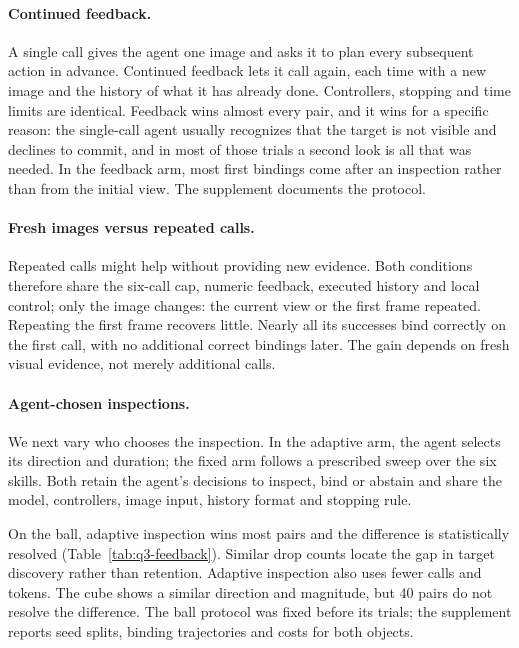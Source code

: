 \paragraph{Continued feedback.}
A single call gives the agent one image and asks it to plan every subsequent action in advance. Continued feedback lets it call again, each time with a new image and the history of what it has already done. Controllers, stopping and time limits are identical. Feedback wins almost every pair, and it wins for a specific reason: the single-call agent usually recognizes that the target is not visible and declines to commit, and in most of those trials a second look is all that was needed. In the feedback arm, most first bindings come after an inspection rather than from the initial view. The supplement documents the protocol.

\paragraph{Fresh images versus repeated calls.}
Repeated calls might help without providing new evidence. Both conditions therefore share the six-call cap, numeric feedback, executed history and local control; only the image changes: the current view or the first frame repeated. Repeating the first frame recovers little. Nearly all its successes bind correctly on the first call, with no additional correct bindings later. The gain depends on fresh visual evidence, not merely additional calls.

\paragraph{Agent-chosen inspections.}
We next vary who chooses the inspection. In the adaptive arm, the agent selects its direction and duration; the fixed arm follows a prescribed sweep over the six skills. Both retain the agent's decisions to inspect, bind or abstain and share the model, controllers, image input, history format and stopping rule.

On the ball, adaptive inspection wins most pairs and the difference is statistically resolved (Table~\ref{tab:q3-feedback}). Similar drop counts locate the gap in target discovery rather than retention. Adaptive inspection also uses fewer calls and tokens. The cube shows a similar direction and magnitude, but 40 pairs do not resolve the difference. The ball protocol was fixed before its trials; the supplement reports seed splits, binding trajectories and costs for both objects.

